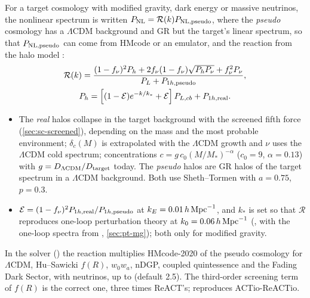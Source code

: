 For a target cosmology with modified gravity, dark energy or massive neutrinos, the nonlinear spectrum is written
$P_{\rm NL}=\mathcal R(k)P_{\rm NL,pseudo}$, where the \emph{pseudo} cosmology has a $\Lambda$CDM background and GR but the
target's linear spectrum, so that $P_{\rm NL,pseudo}$ can come from HMcode or an emulator, and the reaction from the halo
model \cite{Cataneo2019,Bose2020,Bose2021,ReACTv2}:
\begin{gather}
\mathcal R(k)=\frac{(1-f_\nu)^2P_h+2f_\nu(1-f_\nu)\sqrt{P_hP_\nu}+f_\nu^2P_\nu}{P_L+P_{1h,\rm pseudo}},\\
P_h=\left[(1-\mathcal E)e^{-k/k_*}+\mathcal E\right]P_{L,cb}+P_{1h,\rm real}.
\end{gather}
\begin{itemize}
\item The \emph{real} halos collapse in the target background with the screened fifth force (\cref{sec:sc-screened}),
      depending on the mass and the most probable environment; $\delta_c(M)$ is extrapolated with the $\Lambda$CDM growth
      and $\nu$ uses the $\Lambda$CDM cold spectrum; concentrations $c=g\,c_0(M/M_*)^{-\alpha}$ ($c_0=9$, $\alpha=0.13$) with
      $g=D_{\Lambda\rm CDM}/D_{\rm target}$ today. The \emph{pseudo} halos are GR halos of the target spectrum in a
      $\Lambda$CDM background. Both use Sheth--Tormen with $a=0.75$, $p=0.3$.
\item $\mathcal E=(1-f_\nu)^2P_{1h,\rm real}/P_{1h,\rm pseudo}$ at $k_E=0.01\,h\,\mathrm{Mpc}^{-1}$, and $k_*$ is set so that $\mathcal R$
      reproduces one-loop perturbation theory at $k_0=0.06\,h\,\mathrm{Mpc}^{-1}$ (, with the one-loop spectra from
      , \cref{sec:pt-mg}); both only for modified gravity.
\end{itemize}
In the solver () the reaction multiplies HMcode-2020 of the pseudo cosmology for $\Lambda$CDM,
Hu--Sawicki $f(R)$, $w_0w_a$, nDGP, coupled quintessence and the Fading Dark Sector, with neutrinos, up to
 (default 2.5). The third-order screening term of $f(R)$ is the correct one, three times ReACT's;
 reproduces ACTio-ReACTio.

